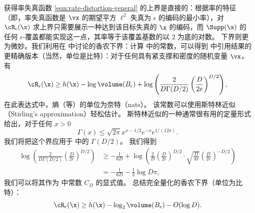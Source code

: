 \documentclass[../../book-main_zh.tex]{subfiles}
\begin{document}
获得率失真函数 \eqref{eqn:rate-distortion-general} 的上界是直接的：根据率的特征（即，率失真函数是 $\vx$ 的期望平方 $\ell^2$ 失真为 $\epsilon$ 的编码的最小率），对 $\cR_{\epsilon}(\x)$ 求上界只需要展示一种达到该目标失真的 $\x$ 的编码，而 $\Supp(\x)$ 的任何 $\epsilon$-覆盖都能实现这一点，其率等于该覆盖基数的以 $2$ 为底的对数。
下界则更为微妙。我们利用在  中讨论的香农下界：计算 \cite[\S III, (22)]{Linder1994-ej} 中的常数，可以得到  中引用结果的更精确版本（当然，单位是比特）：对于任何具有紧支撑和密度的随机变量 $\vx$，有
\begin{equation}\label{eq:slb-appendix-1}
    \cR_{\epsilon}(\x)
    \geq
    h(\x)
    - \log \volume(B_{\epsilon})
    +
    \log
    \left(
        \frac{
            2
        }
        {
            D \Gamma(D/2)
        }
        \left(
            \frac{
                D
            }
            {
                2e
            }
        \right)^{D/2}
    \right),
\end{equation}
在此表达式中，熵（等）的单位为奈特（nats）。
该常数可以使用斯特林近似（Stirling's approximation）轻松估计。
斯特林近似的一种通常很有用的定量形式给出，对于任何 $x > 0$ \cite{Jameson2015-hy}
\begin{equation}
    \Gamma(x) \leq \sqrt{2\pi} x^{x - 1/2} e^{-x} e^{1/(12x)}.
\end{equation}
我们将把这个界应用于  中的 $\Gamma(D/2)$。
我们得到
\begin{align}
    \log
    \left(
        \frac{
            2
        }
        {
            D \Gamma(D/2)
        }
        \left(
            \frac{
                D
            }
            {
                2e
            }
        \right)^{D/2}
    \right)
    &\geq
    -\frac{1}{6D}
    +
    \log\left(
        \frac{2}{D}
        \left(
            \frac{
                D
            }
            {
                2e
            }
        \right)^{D/2}
        \cdot
        \sqrt{\frac{D}{4\pi}}
        \left(
            \frac{D}{2e}
        \right)^{-D/2}
    \right)
    \\
    &=
    -\frac{1}{6D}
    - \frac{1}{2}\log D\pi,\label{eq:slb-constant-est}
\end{align}
我们可以将其作为  中常数 $C_D$ 的显式值。
总结完全量化的香农下界（单位为比特）：
\begin{equation}\label{eq:slb-appendix}
    \cR_{\epsilon}(\x)
    \geq
    h(\x)
    - \log_2 \volume(B_{\epsilon})
    - O(\log D).
\end{equation}
\end{document}
